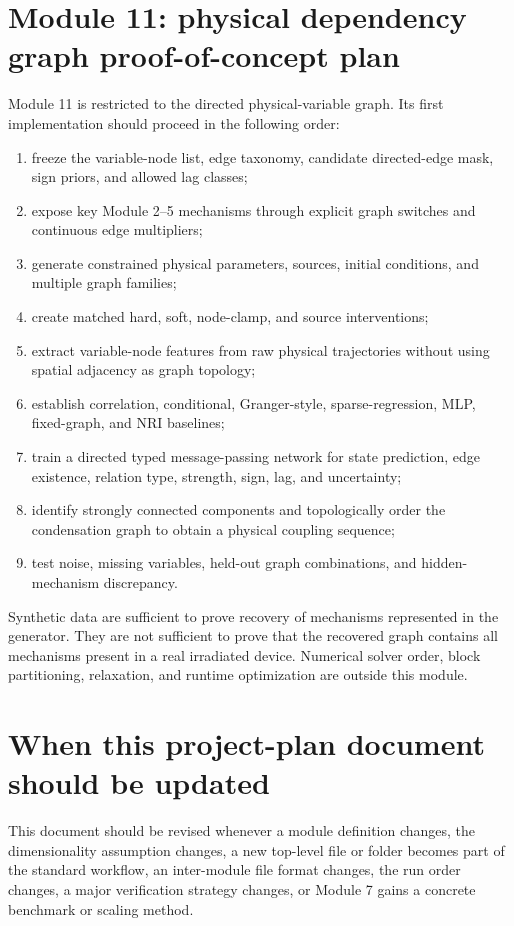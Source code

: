\documentclass[11pt]{article}
\begin{document}
\section{Module 11: physical dependency graph proof-of-concept plan}
Module 11 is restricted to the directed physical-variable graph. Its first implementation should proceed in the following order:
\begin{enumerate}[leftmargin=1.6em]
    \item freeze the variable-node list, edge taxonomy, candidate directed-edge mask, sign priors, and allowed lag classes;
    \item expose key Module 2--5 mechanisms through explicit graph switches and continuous edge multipliers;
    \item generate constrained physical parameters, sources, initial conditions, and multiple graph families;
    \item create matched hard, soft, node-clamp, and source interventions;
    \item extract variable-node features from raw physical trajectories without using spatial adjacency as graph topology;
    \item establish correlation, conditional, Granger-style, sparse-regression, MLP, fixed-graph, and NRI baselines;
    \item train a directed typed message-passing network for state prediction, edge existence, relation type, strength, sign, lag, and uncertainty;
    \item identify strongly connected components and topologically order the condensation graph to obtain a physical coupling sequence;
    \item test noise, missing variables, held-out graph combinations, and hidden-mechanism discrepancy.
\end{enumerate}
Synthetic data are sufficient to prove recovery of mechanisms represented in the generator. They are not sufficient to prove that the recovered graph contains all mechanisms present in a real irradiated device. Numerical solver order, block partitioning, relaxation, and runtime optimization are outside this module.

\section{When this project-plan document should be updated}
This document should be revised whenever a module definition changes, the dimensionality assumption changes, a new top-level file or folder becomes part of the standard workflow, an inter-module file format changes, the run order changes, a major verification strategy changes, or Module 7 gains a concrete benchmark or scaling method.
\end{document}
